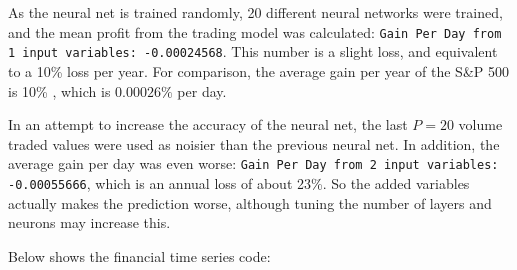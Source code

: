 \documentclass{article}
\begin{document}
\begin{multicols}{2}


As the neural net is trained randomly, 20 different neural networks were trained, and the mean profit from the trading model was calculated: \lstinline|Gain Per Day from 1 input variables: -0.00024568|. This number is a slight loss, and equivalent to a 10\% loss per year. For comparison, the average gain per year of the S\&P 500 is 10\% \cite{averageSnP500Gain}, which is \(0.00026\%\) per day.

In an attempt to increase the accuracy of the neural net, the last \(P = 20\) volume traded values were used as noisier than the previous neural net. In addition, the average gain per day was even worse: \lstinline|Gain Per Day from 2 input variables: -0.00055666|, which is an annual loss of about 23\%. So the added variables actually makes the prediction worse, although tuning the number of layers and neurons may increase this.

Below shows the financial time series code:






\end{multicols}
\end{document}
